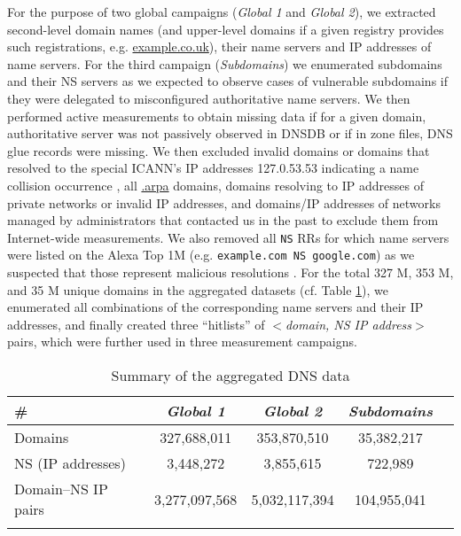 For the purpose of two global campaigns (\textit{Global 1} and \textit{Global 2}),
we extracted second-level domain names  (and upper-level domains if a given registry provides such registrations, e.g. \url{example.co.uk}), their name servers and IP addresses of name servers. 
For the third campaign (\textit{Subdomains}) we enumerated subdomains and their NS servers as we expected to observe cases of vulnerable subdomains if they were delegated to misconfigured authoritative name servers.
We then performed active measurements to obtain missing data if for a given domain, authoritative server was not passively observed in DNSDB or if in zone files, DNS glue records were missing.
We then excluded invalid domains or domains that resolved to the special ICANN's IP addresses 127.0.53.53 indicating a name collision occurrence \cite{127}, %
all \url{.arpa} domains, domains resolving to IP addresses of private networks or invalid IP addresses, and domains/IP addresses of networks managed by administrators that contacted us in the past to exclude them from Internet-wide measurements. 
We also removed all \texttt{NS} RRs for which name servers were listed on the Alexa Top 1M %
(e.g. \texttt{example.com NS google.com}) as we suspected that those represent malicious resolutions \cite{Dagon,wild}.
%
%
For the total 327 M, 353 M, and 35 M unique domains in the aggregated datasets (cf. Table \ref{tab:data}), we enumerated all combinations of the corresponding name servers and their IP addresses, and finally created three ``hitlists'' of \textit{$<$domain, NS IP address$>$} pairs, which were further used in three measurement campaigns. 



\begin{table}
  \caption{Summary of the aggregated DNS data \label{tab:data}}
 \centering
\begin{tabular}{l*{3}{c}r}
\Xhline{2\arrayrulewidth}
\#  & \textbf{\textit{Global 1}} & \textbf{\textit{Global 2}} & \textbf{\textit{Subdomains}}\\
\hline
Domains & 327,688,011 & 353,870,510 & 35,382,217 \\
NS (IP addresses) & 3,448,272 & 3,855,615 & 722,989 \\
Domain--NS IP pairs & 3,277,097,568 & 5,032,117,394 & 104,955,041\\
\Xhline{2\arrayrulewidth}
 \end{tabular}
\end{table}




